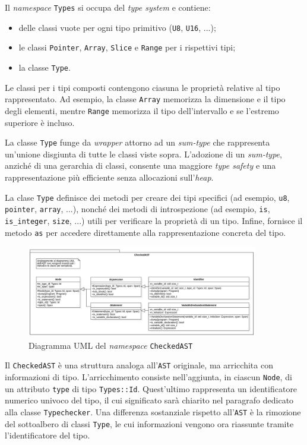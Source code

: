 Il \textit{namespace} \texttt{Types} si occupa del \emph{type system} e contiene:
\begin{itemize}
	\item delle classi vuote per ogni tipo primitivo (\texttt{U8}, \texttt{U16}, ...);
	\item le classi \texttt{Pointer}, \texttt{Array}, \texttt{Slice} e \texttt{Range} per i rispettivi tipi;
	\item la classe \texttt{Type}.
\end{itemize}
Le classi per i tipi composti contengono ciasuna le propriet\`a relative al tipo rappresentato. Ad esempio, la classe \texttt{Array} memorizza la dimensione e il tipo degli elementi, mentre \texttt{Range} memorizza il tipo dell'intervallo e se l'estremo superiore \`e incluso.

La classe \texttt{Type} funge da \textit{wrapper} attorno ad un \textit{sum-type} che rappresenta un'unione disgiunta di tutte le classi viste sopra. L'adozione di un \textit{sum-type}, anzich\'e di una gerarchia di classi, consente una maggiore \textit{type safety} e una rappresentazione pi\`u efficiente senza allocazioni sull'\textit{heap}.

La clase \texttt{Type} definisce dei metodi per creare dei tipi specifici (ad esempio, \texttt{u8}, \texttt{pointer}, \texttt{array}, ...), nonch\'e dei metodi di introspezione (ad esempio, \texttt{is}, \texttt{is\_integer}, \texttt{size}, ...) utili per verificare la propriet\`a di un tipo. Infine, fornisce il metodo \texttt{as} per accedere direttamente alla rappresentazione concreta del tipo.

\begin{figure}[H]
	\centering
	\includegraphics[width=0.9\textwidth]{figures/checked_ast.png}
	\caption{Diagramma UML del \textit{namespace} \texttt{CheckedAST}}
	\label{fig:checked-ast-uml}
\end{figure}

Il \texttt{CheckedAST} \`e una struttura analoga all'\texttt{AST} originale, ma arricchita con informazioni di tipo. L'arricchimento consiste nell'aggiunta, in ciascun \texttt{Node}, di un attributo \texttt{type} di tipo \texttt{Types::Id}. Quest'ultimo rappresenta un identificatore numerico univoco del tipo, il cui significato sarà chiarito nel paragrafo dedicato alla classe \texttt{Typechecker}. Una differenza sostanziale rispetto all'\texttt{AST} è la rimozione del sottoalbero di classi \texttt{Type}, le cui informazioni vengono ora riassunte tramite l'identificatore del tipo.

